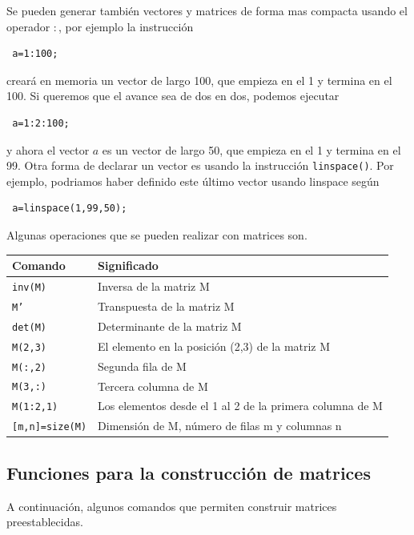 \documentclass[11pt]{article}
\begin{document}
Se pueden generar tambi\'en vectores y matrices de forma mas compacta usando el operador $:$, por ejemplo 
la instrucci\'on 
\begin{verbatim}
 a=1:100;
\end{verbatim}
crear\'a en memoria un vector de largo 100, que empieza en el 1 y termina en el 100. Si queremos que el avance sea de 
dos en dos, podemos ejecutar
\begin{verbatim}
 a=1:2:100;
\end{verbatim}
y ahora el vector $a$ es un vector de largo 50, que empieza en el 1 y termina en el 99. Otra forma de declarar un vector 
es usando la instrucci\'on \texttt{linspace()}. Por ejemplo, podriamos haber definido este \'ultimo vector usando 
linspace seg\'un
\begin{verbatim}
 a=linspace(1,99,50);
\end{verbatim}

Algunas operaciones que se pueden realizar con matrices son.

\begin{center}
\begin{tabular}{l|l}
\hline
Comando		& Significado \\
\hline
\texttt{inv(M)}	&  	Inversa de la matriz M		\\
\texttt{M'}		& 	Transpuesta de la matriz M	\\
\texttt{det(M)}	&	Determinante de la matriz M	\\
\texttt{M(2,3)}	&	El elemento en la posici\'on (2,3) de la matriz M\\
\texttt{M(:,2)}	&	Segunda fila de M\\
\texttt{M(3,:)}	&	Tercera columna de M\\
\texttt{M(1:2,1)}&	Los elementos desde el 1 al 2 de la primera columna de M\\
\texttt{[m,n]=size(M)}& Dimensi\'on de M, n\'umero de filas m y columnas n
\end{tabular}
\end{center}

\subsection{Funciones para la construcci\'on de matrices}

A continuaci\'on, algunos comandos que permiten construir matrices preestablecidas.
\end{document}
